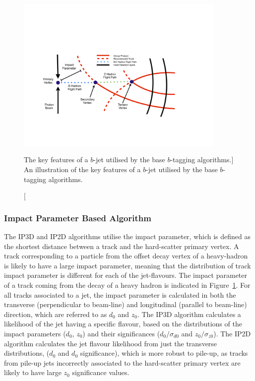 \begin{figure}[!htb]
  \begin{center}
    \includegraphics[width=0.9\textwidth]{figs/Objects/bjets_schem.pdf}
    \caption
    [The key features of a $b$-jet utilised by the base $b$-tagging algorithms.]
    {An illustration of the key features of a $b$-jet utilised by the base $b$-tagging algorithms.}
    \label{fig:obj_bjets_schem}
  \end{center}
  \vspace{-0.5cm}
\end{figure}

\subsubsection{Impact Parameter Based Algorithm}
\label{sec:obj-bjets_IP}

The IP3D and IP2D algorithms utilise the impact parameter, which is defined as the shortest distance between a track and the hard-scatter primary vertex.
A track corresponding to a particle from the offset decay vertex of a heavy-hadron is likely to have a large impact parameter,
meaning that the distribution of track impact parameter is different for each of the jet-flavours.
The impact parameter of a track coming from the decay of a heavy hadron is indicated in Figure~\ref{fig:obj_bjets_schem}.
For all tracks associated to a jet, the impact parameter is calculated in both the transverse (perpendicular to beam-line)
and longitudinal (parallel to beam-line) direction, which are referred to as $d_{0}$ and $z_{0}$.
The IP3D algorithm calculates a likelihood of the jet having a specific flavour, 
based on the distributions of the impact parameters ($d_{0}$, $z_{0}$) and their significances 
($d_{0}/\sigma _{d0}$ and  $z_{0}/\sigma_{z0}$). 
The IP2D algorithm calculates the jet flavour likelihood from just the transverse distributions, ($d_{0}$ and $d_{0}$ significance), which is more
robust to pile-up, as tracks from pile-up jets incorrectly associated to the hard-scatter primary vertex are likely to have large $z_{0}$ significance values.

